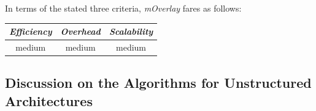 %
In terms of the stated three criteria, \emph{mOverlay} fares as follows:
\begin{center}
{\footnotesize
\begin{tabular}{ccc}
\emph{Efficiency} & \emph{Overhead} & \emph{Scalability} \\
\hline
medium &
medium &
medium
\end{tabular}
}
\end{center}

\subsection{Discussion on the Algorithms for Unstructured Architectures}




